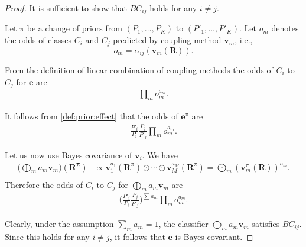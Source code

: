 \documentclass[pdflatex, sn-basic]{sn-jnl}%
\theoremstyle{thmstyleone}%
\theoremstyle{thmstyletwo}%
\theoremstyle{thmstylethree}%
\begin{document}
\begin{proof}
It is sufficient to show that $BC_{ij}$ holds for any $i\not= j$. 

Let $\pi$ be a change of priors from $(P_1, \ldots, P_K)$  to $(P'_1, \ldots, P'_K)$. Let $o_m$ denotes the odds of classes $C_i$ and $C_j$ predicted by coupling method $\boldsymbol{v}_m$, i.e.,
$$
o_m = \alpha_{ij}(\boldsymbol{v}_m(\boldsymbol{R})).
$$

From the definition of linear combination of coupling methods the odds of $C_i$ to $C_j$ for $\boldsymbol{e}$ are
\begin{align}
\prod_m o_m^{a_m}.
\end{align}

It follows from \eqref{def:prior:effect} that the odds of $\boldsymbol{e}^\pi$ are 
\begin{align}
\frac{P'_i}{P_i} \frac{P_j}{P'_j} \prod_m o_m^{a_m}.
\end{align}

Let us now use Bayes covariance of $\boldsymbol{v}_i$. 
We have
\begin{align}
	\biggl(\bigoplus_m a_m \boldsymbol{v}_m\biggr)(\boldsymbol{R^\pi}) & \propto 
	\boldsymbol{v}_1^{a_1}(\boldsymbol{R}^\pi) \odot \cdots \odot \boldsymbol{v}_M^{a_M}(\boldsymbol{R}^\pi) =  \bigodot_m  (\boldsymbol{v}_m^\pi(\boldsymbol{R}))^{a_m}. \\
\end{align}
Therefore the odds of $C_i$ to $C_j$ for $\bigoplus_m a_m \boldsymbol{v}_m$ are 
\begin{align}
\biggl(\frac{P'_i}{P_i} \frac{P_j}{P'_j} \biggr)^{\sum a_m} \prod_m o_m^{a_m}.
\end{align}

Clearly, under the assumption $\sum_m a_m = 1$, the classifier $\bigoplus_m a_m \boldsymbol{v}_m$ satisfies $BC_{ij}$. Since this holds for any $i\not=j$,  it follows that $\boldsymbol{e}$ is Bayes covariant.
\end{proof}


% 
\end{document}
